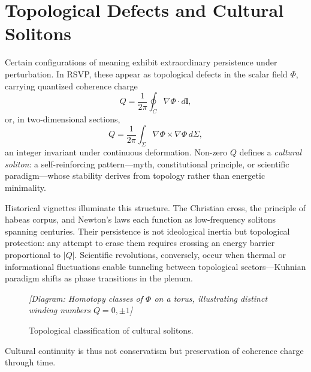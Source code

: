 \documentclass[12pt,a4paper]{article}
\begin{document}
\section{Topological Defects and Cultural Solitons}
Certain configurations of meaning exhibit extraordinary persistence under perturbation. In RSVP, these appear as topological defects in the scalar field $\Phi$, carrying quantized coherence charge
\begin{equation}
Q = \frac{1}{2\pi} \oint_C \nabla \Phi \cdot d\mathbf{l},
\label{eq:line-charge}
\end{equation}
or, in two-dimensional sections,
\begin{equation}
Q = \frac{1}{2\pi} \int_{\Sigma} \nabla \Phi \times \nabla \Phi \, d\Sigma,
\label{eq:surface-charge}
\end{equation}
an integer invariant under continuous deformation. Non-zero $Q$ defines a \emph{cultural soliton}: a self-reinforcing pattern—myth, constitutional principle, or scientific paradigm—whose stability derives from topology rather than energetic minimality.

Historical vignettes illuminate this structure. The Christian cross, the principle of habeas corpus, and Newton’s laws each function as low-frequency solitons spanning centuries. Their persistence is not ideological inertia but topological protection: any attempt to erase them requires crossing an energy barrier proportional to $|Q|$. Scientific revolutions, conversely, occur when thermal or informational fluctuations enable tunneling between topological sectors—Kuhnian paradigm shifts as phase transitions in the plenum.

\begin{figure}[h]
\centering
\textit{[Diagram: Homotopy classes of $\Phi$ on a torus, illustrating distinct winding numbers $Q = 0, \pm 1$]}
\caption{Topological classification of cultural solitons.}
\label{fig:topology}
\end{figure}

Cultural continuity is thus not conservatism but preservation of coherence charge through time.
\end{document}
